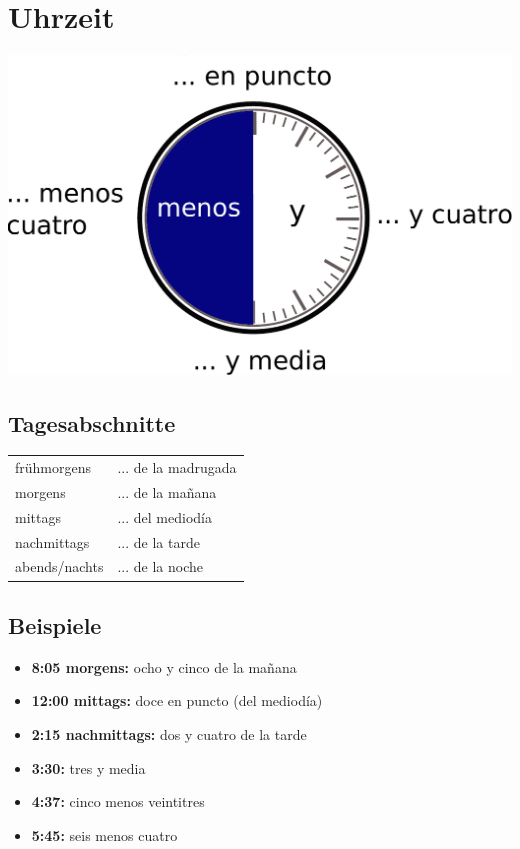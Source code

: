 \documentclass[10pt,spanish]{report}
\begin{document}
\section*{Uhrzeit}

\begin{center}
  \includegraphics[scale=0.5]{uhrzeit.pdf}
\end{center}

\subsection*{Tagesabschnitte}
\begin{longtable}{p{} p{}} 
  frühmorgens & ... de la madrugada \\
  morgens & ... de la ma\~{n}ana \\
  mittags & ... del mediodía \\
  nachmittags & ... de la tarde \\
  abends/nachts & ... de la noche
\end{longtable}

\newpage

\subsection*{Beispiele}
\begin{itemize}
  \item \textbf{8:05 morgens:} ocho y cinco de la ma\~{n}ana 
  \item \textbf{12:00 mittags:} doce en puncto (del mediodía)
  \item \textbf{2:15 nachmittags:} dos y cuatro de la tarde
  \item \textbf{3:30:} tres y media
  \item \textbf{4:37:} cinco menos veintitres
  \item \textbf{5:45:} seis menos cuatro
\end{itemize}
\end{document}

